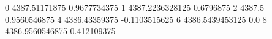 0 4387.51171875 0.9677734375
1 4387.2236328125 0.6796875
2 4387.5 0.9560546875
4 4386.43359375 -0.1103515625
6 4386.5439453125 0.0
8 4386.9560546875 0.412109375
